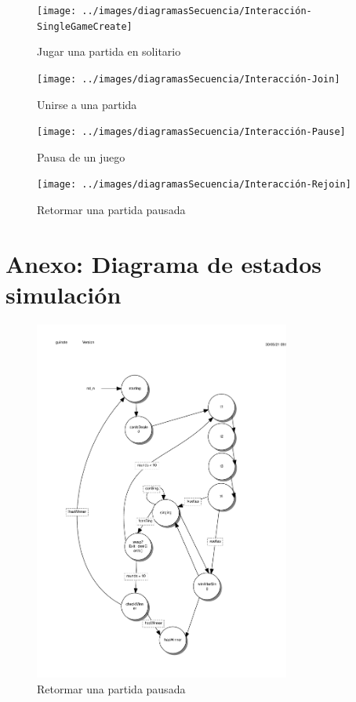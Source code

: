 \documentclass{article}
\begin{document}
\begin{figure}[h]
    \centering
    \texttt{[image: ../images/diagramasSecuencia/Interacción-SingleGameCreate]}
    \caption{Jugar una partida en solitario}
\end{figure}

\begin{figure}[h]
    \centering
    \texttt{[image: ../images/diagramasSecuencia/Interacción-Join]}
    \caption{Unirse a una partida}
\end{figure}

\begin{figure}[h]
    \centering
    \texttt{[image: ../images/diagramasSecuencia/Interacción-Pause]}
    \caption{Pausa de un juego}
\end{figure}

\begin{figure}[h]
    \centering
    \texttt{[image: ../images/diagramasSecuencia/Interacción-Rejoin]}
    \caption{Retormar una partida pausada}
\end{figure}

\FloatBarrier

\section{Anexo: Diagrama de estados simulación}

\begin{figure}[h]
    \centering
    \includegraphics[width=0.75\textwidth]{../images/diagrama_estados.pdf}
    \caption{Retormar una partida pausada}
\end{figure}
\end{document}
